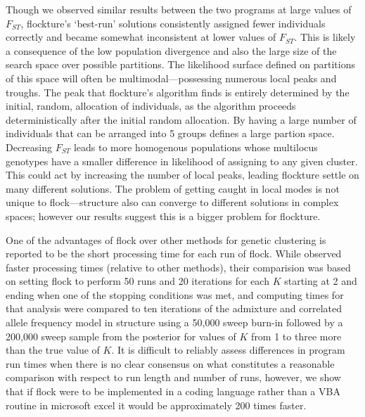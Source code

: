 Though we observed similar results
between the two programs at large values of $F_{ST}$, 
{\sc flockture}'s `best-run' solutions consistently assigned fewer individuals correctly
and became somewhat inconsistent at lower values of $F_{ST}$.
This is likely a consequence of the low population divergence and also
the large size of the search space over possible partitions. 
The likelihood surface defined on partitions of this space will often
be multimodal---possessing numerous local peaks and troughs.
The peak that  {\sc flockture}'s algorithm finds is entirely determined by the initial, random, allocation of 
individuals, as the algorithm proceeds deterministically after the initial random allocation.
By having a large number of individuals
that can be arranged into 5 groups defines a large partion space.
Decreasing $F_{ST}$ leads to more homogenous 
populations whose multilocus genotypes have a smaller difference in 
likelihood of assigning to any given cluster. This could act by increasing the number of
local peaks, leading {\sc flockture} settle on many different solutions. The problem of getting 
caught in local modes is not unique to {\sc flock}---{\sc structure} also can converge to 
different solutions in complex spaces; however our results suggest this is a bigger problem for {\sc flockture}.
   
One of the advantages of {\sc flock} over other methods for genetic clustering
is reported to be the short processing time for each run of {\sc flock}.
While \citet{Duc&Tur2012} observed faster processing times (relative to other methods), 
their comparision was based on setting {\sc flock} to perform 50 runs and 20 iterations for each 
$K$ starting at 2 and ending when one of the stopping conditions was met, and computing times for that analysis 
were compared to ten iterations of the admixture and correlated allele frequency model in {\sc structure} using 
a 50,000 sweep burn-in followed by a 200,000 sweep sample 
from the posterior for values of $K$ from 1 to three more than the true 
value of $K$. It is difficult to reliably assess differences in program run times when there is no clear consensus on what 
constitutes a reasonable comparison with respect to run length and number of runs, however, we show that if 
{\sc flock} were to be implemented in a coding language rather than a VBA routine in microsoft excel
it would be approximately 200 times faster.

